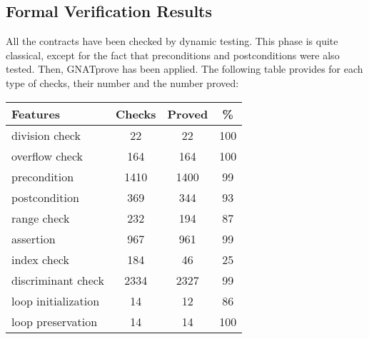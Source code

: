 \documentclass[10pt,a4paper,twocolumn]{article}
\newcommand{\gnatprove}{GNATprove\xspace}
\begin{document}
\subsection{Formal Verification Results}

All the contracts have been checked by dynamic testing. This phase is quite
classical, except for the fact that preconditions and postconditions were also
tested. Then, \gnatprove has been applied. The following table provides for each
type of checks, their number and the number proved:

\vspace{5mm}

\begin{tabular}{|l|c|c|c|}
\hline
{\bf Features}            & {\bf Checks} & {\bf Proved} & {\bf \%}  \\
\hline
division check      & 22     & 22     & 100 \\
\hline
overflow check      & 164    & 164    & 100 \\
\hline
precondition        & 1410   & 1400   & 99  \\
\hline
postcondition       & 369    & 344    & 93  \\
\hline
range check         & 232    & 194    & 87  \\
\hline
assertion           & 967    & 961    & 99  \\
\hline
index check         & 184    & 46     & 25  \\
\hline
discriminant check  & 2334   & 2327   & 99  \\
\hline
loop initialization & 14     & 12     & 86  \\
\hline
loop  preservation  & 14     & 14     & 100 \\
\hline
\end{tabular}

\vspace{5mm}
\end{document}
